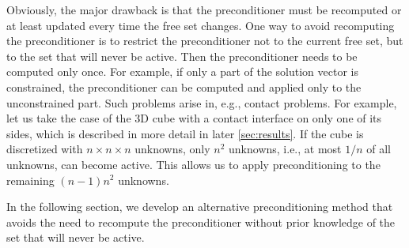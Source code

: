 \documentclass[11pt]{article}
\theoremstyle{plain}
\theoremstyle{definition}
\begin{document}
Obviously, the major drawback is that the preconditioner must be recomputed or at least updated every time the free set changes.
One way to avoid recomputing the preconditioner is to restrict the preconditioner not to the current free set, but to the set that will never be active.
Then the preconditioner needs to be computed only once.
For example, if only a part of the solution vector is constrained, the preconditioner can be computed and applied only to the unconstrained part.
Such problems arise in, e.g., contact problems.
For example, let us take the case of the 3D cube with a contact interface on only one of its sides, which is described in more detail in later \cref{sec:results}.
If the cube is discretized with $n \times n \times n$ unknowns, only $n^{2}$ unknowns, i.e., at most $1/n$ of all unknowns, can become active.
This allows us to apply preconditioning to the remaining $\left(n-1\right)n^2$ unknowns.

In the following section, we develop an alternative preconditioning method that avoids the need to recompute the preconditioner without prior knowledge of the set that will never be active.
\end{document}
